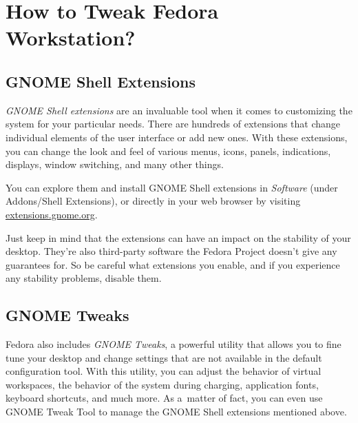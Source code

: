 \chapter*{How to Tweak Fedora Workstation?}
\section*{GNOME Shell Extensions}

\emph{GNOME Shell extensions} are an invaluable tool when it comes to customizing the system for your particular needs. There are hundreds of extensions that change individual elements of the user interface or add new ones. With these extensions, you can change the look and feel of various menus, icons, panels, indications, displays, window switching, and many other things.

You can explore them and install GNOME Shell extensions in \emph{Software} (under Addons/Shell Extensions), or directly in your web browser by visiting \url{extensions.gnome.org}.

Just keep in mind that the extensions can have an impact on the stability of your desktop. They're also third-party software the Fedora Project doesn't give any guarantees for. So be careful what extensions you enable, and if you experience any stability problems, disable them.

\section*{GNOME Tweaks}

Fedora also includes \emph{GNOME Tweaks}, a powerful utility that allows you to fine tune your desktop and change settings that are not available in the default configuration tool. With this utility, you can adjust the behavior of virtual workspaces, the behavior of the system during charging, application fonts, keyboard shortcuts, and much more. As a~matter of fact, you can even use GNOME Tweak Tool to manage the GNOME Shell extensions mentioned above.
\endinput
